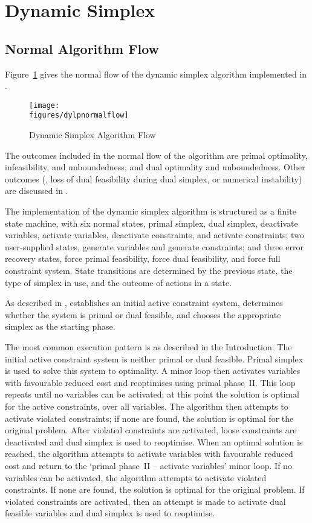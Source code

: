 \section{Dynamic Simplex}
\label{sec:DynamicSimplex}

\subsection{Normal Algorithm Flow}
\label{sec:NormalDynamicFlow}

Figure~\ref{fig:DylpFlow} gives the normal flow of the dynamic simplex
algorithm implemented in \dylp.
\begin{figure}
\centering
\texttt{[image: \\figures/dylpnormalflow]}
\caption{Dynamic Simplex Algorithm Flow} \label{fig:DylpFlow}
\end{figure}
The outcomes included in the normal flow of the algorithm are primal
optimality, infeasibility, and unboundedness, and dual optimality and
unboundedness.
Other outcomes (\eg, loss of dual feasibility during dual simplex, or
numerical instability) are discussed in .

The implementation of the dynamic simplex algorithm is structured as
a finite state machine, with six normal states,
primal simplex, dual simplex,
deactivate variables, activate variables,
deactivate constraints, and activate constraints;
two user-supplied states, generate variables and generate constraints;
and three error recovery states,
force primal feasibility, force dual feasibility,
and force full constraint system.
State transitions are determined by the previous state,
the type of simplex in use, and the outcome of actions in a state.

As described in , \dylp establishes an initial active
constraint system, determines whether the system is primal or dual feasible,
and chooses the appropriate simplex as the starting phase.

The most common execution pattern is as described in the Introduction:
The initial active constraint system is neither primal or dual feasible.
Primal simplex is used to solve this system to optimality.
A minor loop then activates variables with favourable reduced cost and
reoptimises using primal phase~II\@.
This loop repeats until no variables can be activated; at this point the
solution is optimal for the active constraints, over all variables.
The algorithm then attempts to activate violated constraints; if none are
found, the solution is optimal for the original problem.
After violated constraints are activated, loose constraints are deactivated
and dual simplex is used to reoptimise.
When an optimal solution is reached, the algorithm attempts to activate
variables with favourable reduced cost and return to the
`primal phase~II -- activate variables' minor loop.
If no variables can be activated, the algorithm attempts to activate violated
constraints.
If none are found, the solution is optimal for the original problem.
If violated constraints are activated, then an attempt is made to activate
dual feasible variables and dual simplex is used to reoptimise.

